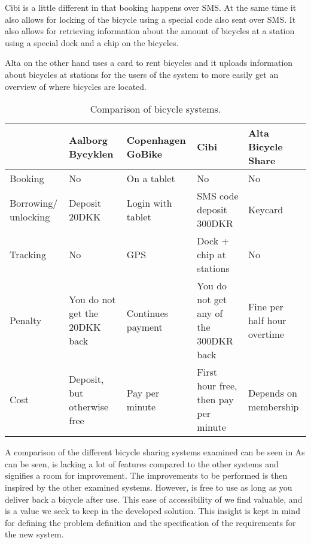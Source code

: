 Cibi is a little different in that booking happens over SMS.
At the same time it also allows for locking of the bicycle using a special code also sent over SMS.
It also allows for retrieving information about the amount of bicycles at a station using a special dock and a chip on the bicycles.

Alta on the other hand uses a card to rent bicycles and it uploads information about bicycles at stations for the users of the system to more easily get an overview of where bicycles are located.

\begin{table}[h]
	\begin{tabular}{|p{}|p{}|p{}|p{}|p{}|}
		\hline  & Aalborg Bycyklen & Copenhagen GoBike & Cibi & Alta Bicycle Share \\ 
		\hline Booking & No & On a tablet & No & No \\ 
		\hline Borrowing/ unlocking & Deposit 20DKK & Login with tablet &  SMS code deposit 300DKR & Keycard \\ 
		\hline Tracking & No & GPS & Dock + chip at stations & No \\ 
		\hline Penalty & You do not get the 20DKK back & Continues payment & You do not get any of the 300DKR back & Fine per half hour overtime \\ 
		\hline Cost & Deposit, but otherwise free & Pay per minute & First hour free, then pay per minute & Depends on membership \\ 
		\hline 
	\end{tabular} 
	\caption{Comparison of bicycle systems.}
	\label{tab:bicyclecompare}
\end{table}

A comparison of the different bicycle sharing systems examined can be seen in 
As can be seen, \bycykel is lacking a lot of features compared to the other systems and signifies a room for improvement.
The improvements to be performed is then inspired by the other examined systems.
However, \bycykel is free to use as long as you deliver back a bicycle after use. 
This ease of accessibility of \bycykel we find valuable, and is a value we seek to keep in the developed solution.
This insight is kept in mind for defining the problem definition and the specification of the requirements for the new system.